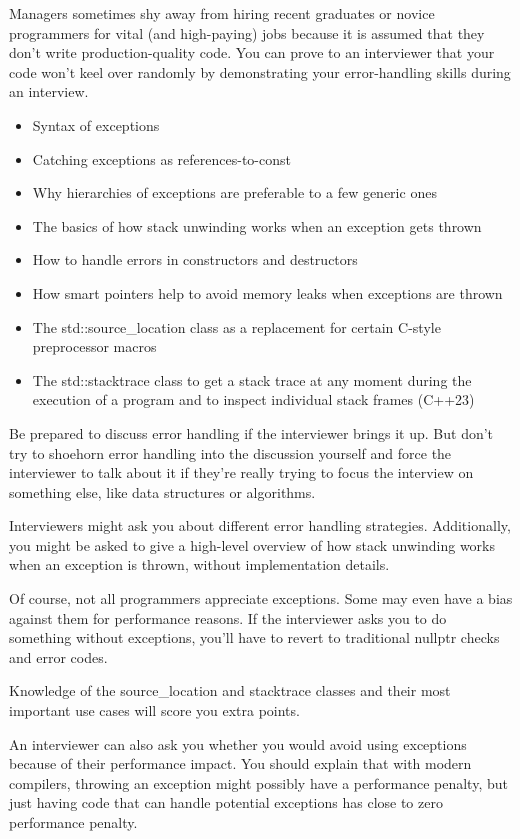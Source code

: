 
Managers sometimes shy away from hiring recent graduates or novice programmers for vital (and high-paying) jobs because it is assumed that they don’t write production-quality code. You can prove to an interviewer that your code won’t keel over randomly by demonstrating your error-handling skills during an interview.


\begin{itemize}
\item
Syntax of exceptions

\item
Catching exceptions as references-to-const

\item
Why hierarchies of exceptions are preferable to a few generic ones

\item
The basics of how stack unwinding works when an exception gets thrown

\item
How to handle errors in constructors and destructors

\item
How smart pointers help to avoid memory leaks when exceptions are thrown

\item
The std::source\_location class as a replacement for certain C-style preprocessor macros

\item
The std::stacktrace class to get a stack trace at any moment during the execution of a program and to inspect individual stack frames (C++23)
\end{itemize}


Be prepared to discuss error handling if the interviewer brings it up. But don’t try to shoehorn error handling into the discussion yourself and force the interviewer to talk about it if they’re really trying to focus the interview on something else, like data structures or algorithms.

Interviewers might ask you about different error handling strategies. Additionally, you might be asked to give a high-level overview of how stack unwinding works when an exception is thrown, without implementation details.

Of course, not all programmers appreciate exceptions. Some may even have a bias against them for performance reasons. If the interviewer asks you to do something without exceptions, you’ll have to revert to traditional nullptr checks and error codes.

Knowledge of the source\_location and stacktrace classes and their most important use cases will score you extra points.

An interviewer can also ask you whether you would avoid using exceptions because of their performance impact. You should explain that with modern compilers, throwing an exception might possibly have a performance penalty, but just having code that can handle potential exceptions has close to zero performance penalty.

